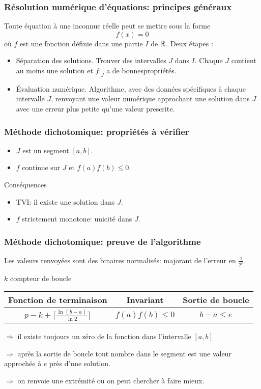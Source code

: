 
\lstset{language=Python,frame=single}

\begin{frame}
  \frametitle{Résolution numérique d'équations: principes généraux}
Toute équation à une inconnue réelle peut se mettre sous la forme
\begin{displaymath}
  f(x) = 0
\end{displaymath}
où $f$ est une fonction définie dans une partie $I$ de $\mathbb{R}$. Deux étapes :
\begin{itemize}
  \item Séparation des solutions.\newline
Trouver des intervalles $J$ dans $I$. Chaque $J$ contient au moins une solution et $f|_J$ a de \og bonnes\fg  propriétés.
  \item \'Evaluation numérique. \newline
  Algorithme, avec des données spécifiques à chaque intervalle $J$, renvoyant une valeur numérique approchant une solution dans $J$ avec une erreur plus petite qu'une valeur prescrite.
\end{itemize} 
\end{frame}

\begin{frame}
  \frametitle{Méthode dichotomique: propriétés à vérifier}
\begin{itemize}
  \item $J$ est un segment $[a,b]$.
  \item $f$ continue sur $J$ et $f(a)f(b)\leq 0$. 
\end{itemize}
Conséquences
\begin{itemize}
  \item TVI: il existe une solution dans $J$.
  \item $f$ strictement monotone: unicité dans $J$. 
\end{itemize}
\end{frame}

\begin{frame}
  \frametitle{Méthode dichotomique: preuve de l'algorithme}
Les valeurs renvoyées sont des binaires normalisés: majorant de l'erreur en $\frac{1}{2^p}$.

$k$ compteur de boucle
\begin{center}
\renewcommand{\arraystretch}{1.5}
\begin{tabular}{|c|c|c|}\hline
Fonction de terminaison                     & Invariant      & Sortie de boucle \\ \hline
$p-k + \lceil \frac{\ln(b-a)}{\ln 2}\rceil$ & $f(a)f(b)\leq 0$ & $ b - a \leq e$ \\ \hline
\end{tabular}
\end{center}
$\Rightarrow$ il existe toujours un zéro de la fonction dans l'intervalle $[a,b]$

$\Rightarrow$ après la sortie de boucle tout nombre dans le segment est une valeur approchée à $e$ près d'une solution.

$\Rightarrow$ on renvoie une extrémité ou on peut chercher à faire mieux.
\end{frame}

